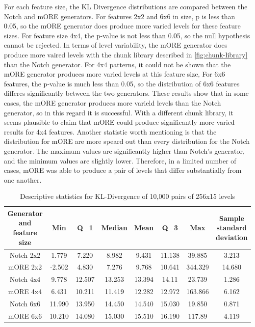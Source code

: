 For each feature size, the KL Divergence distributions are compared between the Notch and 
mORE generators. For features 2x2 and 6x6 in size, p is less than 0.05, so the mORE
generator does produce more varied levels for these feature sizes. For feature size 4x4,
the p-value is not less than 0.05, so the null hypothesis cannot be rejected. In terms of
level variability, the mORE generator does produce more vaired levels with the chunk library
described in \autoref{fig:chunk-library} than the Notch generator. For 4x4 patterns, it could
not be shown that the mORE generator produces more varied levels at this feature size,
For 6x6 features, the p-value is much less than 0.05, so the distribution of 6x6 features
differes significantly between the two generators. These results show that in some cases,
the mORE generator produces more varield levels than the Notch generator, so in this regard
it is successful. With a different chunk library, it seems plausible to claim that mORE could
produce significantly more varied results for 4x4 features. Another statistic worth 
mentioning is that the distribution for mORE are more speard out than every distribution for
the Notch generator. The maximum values are significantly higher than Notch's generator, and
the minimum values are slightly lower. Therefore, in a limited number of cases, mORE was 
able to produce a pair of levels that differ substantially from one another.

\begin{table}[h]
\centering
\begin{tabular}{| c | c | c | c | c | c | c | c |}
\hline
Generator and feature size & Min & Q_1 & Median & Mean & Q_3 & Max & Sample standard deviation\\
\hline
Notch 2x2 & 1.779 & 7.220 & 8.982 & 9.431 & 11.138 & 39.885 & 3.213\\
mORE 2x2 & -2.502 & 4.830 & 7.276 & 9.768 & 10.641 & 344.329 & 14.680\\
Notch 4x4 & 9.778 & 12.507 & 13.253 & 13.394 & 14.11 & 23.739 & 1.286\\
mORE 4x4 & 6.431 & 10.211 & 11.419 & 12.282 & 12.972 & 163.866 & 6.162\\
Notch 6x6 & 11.990 & 13.950 & 14.450 & 14.540 & 15.030 & 19.850 & 0.871\\
mORE 6x6 & 10.210 & 14.080 & 15.030 & 15.510 & 16.190 & 117.89 & 4.119\\
\hline
\end{tabular}
\caption{Descriptive statistics for KL-Divergence of 10,000 pairs of 256x15 levels}
\label{table:more-ore-desc}
\end{table}

